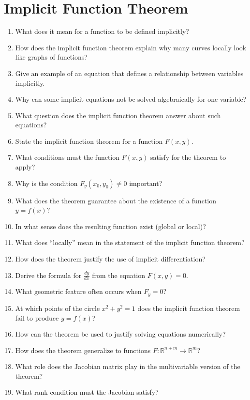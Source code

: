 \section{Implicit Function Theorem}

\begin{enumerate}
  \item What does it mean for a function to be defined implicitly?
  \item How does the implicit function theorem explain why many curves locally look like graphs of functions?
  \item Give an example of an equation that defines a relationship between variables implicitly.
  \item Why can some implicit equations not be solved algebraically for one variable?
  \item What question does the implicit function theorem answer about such equations?
  \item State the implicit function theorem for a function \(F(x,y)\).
  \item What conditions must the function \(F(x,y)\) satisfy for the theorem to apply?
  \item Why is the condition \(F_{y}(x_{0},y_{0}) \neq 0\) important?
  \item What does the theorem guarantee about the existence of a function \(y=f(x)\)?
  \item In what sense does the resulting function exist (global or local)?
  \item What does ``locally'' mean in the statement of the implicit function theorem?
  \item How does the theorem justify the use of implicit differentiation?
  \item Derive the formula for \(\frac{dy}{dx}\) from the equation \(F(x,y)=0\).
  \item What geometric feature often occurs when \(F_{y}=0\)?
  \item At which points of the circle \(x^{2}+y^{2}=1\) does the implicit function theorem fail to produce \(y=f(x)\)?
  \item How can the theorem be used to justify solving equations numerically?
  \item How does the theorem generalize to functions \(F:\mathbb{R}^{n+m}\to \mathbb{R}^{m}\)?
  \item What role does the Jacobian matrix play in the multivariable version of the theorem?
  \item What rank condition must the Jacobian satisfy?

\end{enumerate}
